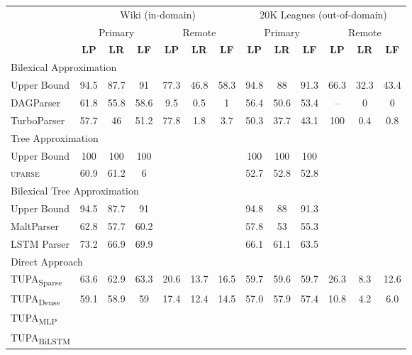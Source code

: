 \documentclass[11pt,a4paper]{article}
\newcommand{\parser}[1]{TUPA\textsubscript{#1}}
\begin{document}
\begin{table*}[ht]
\begin{tabular}{l|ccc|ccc||ccc|ccc}
& \multicolumn{6}{c||}{Wiki (in-domain)} & \multicolumn{6}{c}{20K Leagues (out-of-domain)} \\
& \multicolumn{3}{c|}{Primary} & \multicolumn{3}{c||}{Remote}
& \multicolumn{3}{c|}{Primary} & \multicolumn{3}{c}{Remote} \\
& \textbf{LP} & \textbf{LR} & \textbf{LF} & \textbf{LP} & \textbf{LR} & \textbf{LF}
& \textbf{LP} & \textbf{LR} & \textbf{LF} & \textbf{LP} & \textbf{LR} & \textbf{LF} \\
\hline
\multicolumn{4}{l}{\rule{0pt}{2ex} \footnotesize Bilexical Approximation} \\
\small Upper Bound
& \small 94.5 & \small 87.7 & \small 91 & \small 77.3 & \small 46.8 & \small 58.3
& \small 94.8 & \small 88 & \small 91.3 & \small 66.3 & \small 32.3 & \small 43.4 \\
DAGParser
& 61.8 & 55.8 & 58.6 & 9.5 & 0.5 & 1
& 56.4 & 50.6 & 53.4 & -- & 0 & 0 \\
TurboParser
& 57.7 & 46 & 51.2 & 77.8 & 1.8 & 3.7
& 50.3 & 37.7 & 43.1 & 100 & 0.4 & 0.8 \\
\hline
\multicolumn{4}{l}{\rule{0pt}{2ex} \footnotesize Tree Approximation} \\
\small Upper Bound
& \small 100 & \small 100 & \small 100 & & &
& \small 100 & \small 100 & \small 100 \\
\textsc{uparse}
& 60.9 & 61.2 & 6 & & &
& 52.7 & 52.8 & 52.8 \\
\hline
\multicolumn{4}{l}{\rule{0pt}{2ex} \footnotesize Bilexical Tree Approximation} \\
\small Upper Bound
& \small 94.5 & \small 87.7 & \small 91 & & &
& \small 94.8 & \small 88 & \small 91.3 \\
MaltParser
& 62.8 & 57.7 & 60.2 & & &
& 57.8 & 53 & 55.3 \\
LSTM Parser
& 73.2 & 66.9 & 69.9 & & &
& 66.1 & 61.1 & 63.5 \\
\hline
\multicolumn{4}{l}{\rule{0pt}{2ex} \footnotesize Direct Approach} \\
\parser{Sparse}
& 63.6 & 62.9 & 63.3 & 20.6 & 13.7 & 16.5
& 59.7 & 59.6 & 59.7 & 26.3 & 8.3 & 12.6 \\
\parser{Dense} 
& 59.1 & 58.9 & 59 & 17.4 & 12.4 & 14.5
& 57.0 & 57.9 & 57.4 & 10.8 & 4.2 & 6.0 \\
\parser{MLP}
& 
& \\
\parser{BiLSTM}
& 
& 
\end{tabular}
\caption{\label{table:results}
  Main experimental results in percents, on the \textit{Wiki} test set (left)
  and the \textit{20K Leagues} set (right).
  Columns correspond to labeled precision, recall and F-score,
  for both primary and remote edges.
  \parser{BiLSTM} obtains the highest scores in all metrics, surpassing the bilexical parsers
  and the other classifiers.
}
\end{table*}
\end{document}

